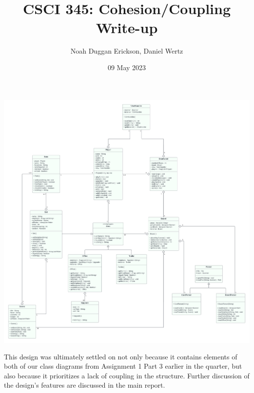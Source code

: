 \documentclass[letterpaper, landscape, twoside, fullpage]{report}
\title{CSCI 345: Cohesion/Coupling Write-up}
\author{Noah Duggan Erickson, Daniel Wertz}
\date{09 May 2023}
\begin{document}
\maketitle
\begin{center}
\includegraphics[scale=0.22]{Diagram.pdf}
\end{center}
\newpage
This design was ultimately settled on not only because it contains elements of both of our class diagrams from Assignment 1 Part 3 earlier in the quarter, but also because it prioritizes a lack of coupling in the structure. Further discussion of the design's features are discussed in the main report.
\end{document}

